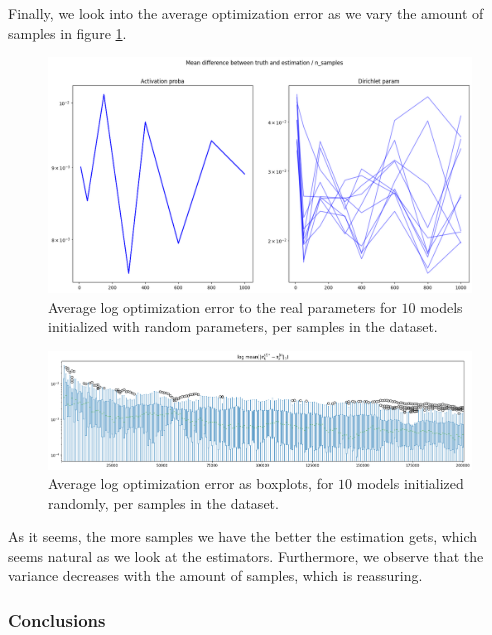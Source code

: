 Finally, we look into the average optimization error as we vary the amount of samples in figure \ref{fig:markovian_tree_model_error_mean_sample}.
\begin{figure}[H]
    \centering
    \includegraphics[scale=0.4]{images/markovian_tree_model_mean_error_samples}
    \caption{Average log optimization error to the real parameters for $10$ models initialized with random parameters, per samples in the dataset.}
    \label{fig:markovian_tree_model_error_mean_sample}
\end{figure}

\begin{figure}[H]
    \centering
    \includegraphics[scale=0.4]{images/markovian_tree_model_mean_error_samples_boxplot}
    \caption{Average log optimization error as boxplots, for $10$ models initialized randomly, per samples in the dataset.}
    \label{fig:markovian_tree_model_error_mean_sample_boxplot}
\end{figure}

As it seems, the more samples we have the better the estimation gets, which seems natural as we look at the estimators.
Furthermore, we observe that the variance decreases with the amount of samples, which is reassuring.

\subsubsection{Conclusions}

